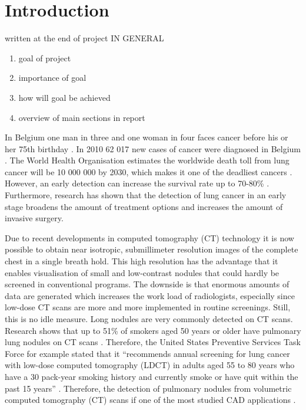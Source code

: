 \section{Introduction}

written at the end of project
IN GENERAL
\begin{enumerate}
\item goal of project
\item importance of goal
\item how will goal be achieved
\item overview of main sections in report
\end{enumerate}

In Belgium one man in three and one woman in four faces cancer before his or
her 75th birthday \cite{kanker}. In 2010 62 017 new cases of cancer were
diagnosed in Belgium \cite{kankerliga}. The World Health Organisation estimates
the worldwide death toll from lung cancer will be 10 000 000 by 2030, which
makes it one of the deadliest cancers \cite{gu, zheng}.
However, an early detection can increase the survival rate up to 70-80\%
\cite{swensen}. Furthermore, research has shown that the detection of lung
cancer in an early stage broadens the amount of treatment options and increases
the amount of invasive surgery\cite{greenlee}.


Due to recent developments in
computed tomography (CT) technology it is now possible to obtain near isotropic,
submillimeter resolution images of the complete chest in a single breath hold.
This high resolution has the advantage that it enables visualisation of small
and low-contrast nodules that could hardly be screened in conventional
programs. The downside is that enormous amounts of data are generated
which increases the work load of radiologists, especially since low-dose CT
scans are more and more implemented in routine screenings. Still, this is no
idle measure. Long nodules are very commonly detected on CT scans. Research
shows that up to 51\% of smokers aged 50 years or older have pulmonary lung
nodules on CT scans \cite{mahon}. Therefore, the United States Preventive
Services Task Force for example stated that it ``recommends annual screening for
lung cancer with low-dose computed tomography (LDCT) in adults aged 55 to 80
years who have a 30 pack-year smoking history and currently smoke or have quit
within the past 15 years'' \cite{ups}.
Therefore, the detection of pulmonary nodules from volumetric computed
tomography (CT) scans if one of the most studied CAD applications
\cite{sluimer}.


